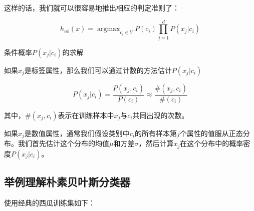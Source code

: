 这样的话，我们就可以很容易地推出相应的判定准则了：

$$
h_{nb}({x})=\mathop{\arg \max}_{c_i\in Y} P(c_i)\prod_{j=1}^dP(x_j|c_i)
$$

条件概率$P(x_j|c_i)$的求解


如果$x_j$是标签属性，那么我们可以通过计数的方法估计$P(x_j|c_i)$

$$
P(x_j|c_i)=\frac{P(x_j,c_i)}{P(c_i)}\approx\frac{\#(x_j,c_i)}{\#(c_i)}
$$

其中，$\#(x_j,c_i)$表示在训练样本中$x_j$与$c_{i}$共同出现的次数。

如果$x_j$是数值属性，通常我们假设类别中$c_{i}$的所有样本第$j$个属性的值服从正态分布。我们首先估计这个分布的均值$μ$和方差$σ$，然后计算$x_j$在这个分布中的概率密度$P(x_j|c_i)$。


\subsection{举例理解朴素贝叶斯分类器}

使用经典的西瓜训练集如下：

